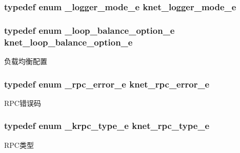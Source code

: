 \subsubsection[{knet\+\_\+logger\+\_\+mode\+\_\+e}]{\setlength{\rightskip}{0pt plus 5cm}typedef enum {\bf \+\_\+logger\+\_\+mode\+\_\+e}  {\bf knet\+\_\+logger\+\_\+mode\+\_\+e}}\label{a00051_a3ad8e017e53143bca2ada78d2bfa30e1_a3ad8e017e53143bca2ada78d2bfa30e1}
\hypertarget{a00051_aa131da8fb72468b39b6ee0e2d46b17b2_aa131da8fb72468b39b6ee0e2d46b17b2}{}
\subsubsection[{knet\+\_\+loop\+\_\+balance\+\_\+option\+\_\+e}]{\setlength{\rightskip}{0pt plus 5cm}typedef enum {\bf \+\_\+loop\+\_\+balance\+\_\+option\+\_\+e}  {\bf knet\+\_\+loop\+\_\+balance\+\_\+option\+\_\+e}}\label{a00051_aa131da8fb72468b39b6ee0e2d46b17b2_aa131da8fb72468b39b6ee0e2d46b17b2}
负载均衡配置 \hypertarget{a00051_a09f6be2164ffa374198a4ab2af2e1966_a09f6be2164ffa374198a4ab2af2e1966}{}
\subsubsection[{knet\+\_\+rpc\+\_\+error\+\_\+e}]{\setlength{\rightskip}{0pt plus 5cm}typedef enum {\bf \+\_\+rpc\+\_\+error\+\_\+e}  {\bf knet\+\_\+rpc\+\_\+error\+\_\+e}}\label{a00051_a09f6be2164ffa374198a4ab2af2e1966_a09f6be2164ffa374198a4ab2af2e1966}
R\+P\+C错误码 \hypertarget{a00051_a6fe1ebc0ddea56dd3c337115c1e10bc4_a6fe1ebc0ddea56dd3c337115c1e10bc4}{}
\subsubsection[{knet\+\_\+rpc\+\_\+type\+\_\+e}]{\setlength{\rightskip}{0pt plus 5cm}typedef enum {\bf \+\_\+krpc\+\_\+type\+\_\+e}  {\bf knet\+\_\+rpc\+\_\+type\+\_\+e}}\label{a00051_a6fe1ebc0ddea56dd3c337115c1e10bc4_a6fe1ebc0ddea56dd3c337115c1e10bc4}
R\+P\+C类型 \hypertarget{a00051_a8741dac4a9f8d97603eb3a30a3473b13_a8741dac4a9f8d97603eb3a30a3473b13}{}
